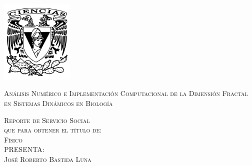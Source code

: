 \documentclass[letterpaper,12pt,oneside]{book}
\begin{document}
\begin{titlepage}
        \begin{minipage}[c][0.81\textheight][t]{0.25\textwidth}
            \vspace*{5mm}
            \begin{center}
                \hskip2.0mm
                \vrule width1pt height13cm 
                \vspace{5mm}
                \hskip2pt
                \vrule width2.5pt height13cm
                \hskip2mm
                \vrule width1pt height13cm \\
                \vspace{5mm}
                \includegraphics[height=4.0cm]{Escudo-FCIENCIAS.pdf}
            \end{center}
        \end{minipage}
        \begin{minipage}[c][0.81\textheight][t]{0.75\textwidth}
            \begin{center}
                \vspace{1cm}

                {\large\scshape Análisis Numérico e Implementación Computacional de la Dimensión Fractal en Sistemas Dinámicos en Biología}\\[.2in]

                \vspace{2cm}            

                \textsc{\LARGE Reporte de Servicio Social} \\[0.5cm]
                \textsc{\large que para obtener el t\'itulo de:}\\[0.5cm]
                \textsc{\large Físico}\\[0.5cm]
                \textsc{\large P\hspace{0.5cm}R\hspace{0.5cm}E\hspace{0.5cm}S\hspace{0.5cm}E\hspace{0.5cm}N\hspace{0.5cm}T\hspace{0.5cm}A:}\\[0.5cm]
                \textsc{\large {José Roberto Bastida Luna}}\\[2cm]          


\end{center}
\end{minipage}
\end{titlepage}
\end{document}
